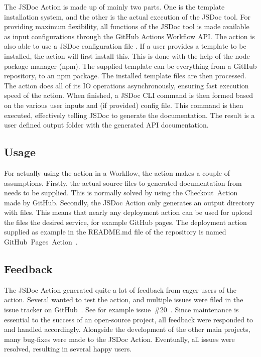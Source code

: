 The JSDoc Action is made up of mainly two parts. One is the template installation system, and the other is the actual execution of the JSDoc tool. For providing maximum flexibility, all functions of the JSDoc tool is made available as input configurations through the GitHub Actions Workflow API. The action is also able to use a JSDoc configuration file \cite{jsdoc-config-file}. If a user provides a template to be installed, the action will first install this. This is done with the help of the node package manager (npm). The supplied template can be everything from a GitHub repository, to an npm package. The installed template files are then processed. The action does all of its IO operations asynchronously, ensuring fast execution speed of the action. When finished, a JSDoc CLI command is then formed based on the various user inputs and (if provided) config file. This command is then executed, effectively telling JSDoc to generate the documentation. The result is a user defined output folder with the generated API documentation.

\subsection{Usage}
For actually using the action in a Workflow, the action makes a couple of assumptions. Firstly, the actual source files to generated documentation from needs to be supplied. This is normally solved by using the Checkout~Action~\cite{checkout-action} made by GitHub. Secondly, the JSDoc Action only generates an output directory with files. This means that nearly any deployment action can be used for upload the files the desired service, for example GitHub pages. The deployment action supplied as example in the README.md file of the repository is named GitHub~Pages~Action~\cite{github-pages-action}.

\subsection{Feedback}
The JSDoc Action generated quite a lot of feedback from eager users of the action. Several wanted to test the action, and multiple issues were filed in the issue tracker on GitHub~\cite{jsdoc-action-issue-tracker}. See for example issue~\#20~\cite{jsdoc-issue-20}. Since maintenance is essential to the success of an open-source project, all feedback were responded to and handled accordingly. Alongside the development of the other main projects, many bug-fixes were made to the JSDoc Action. Eventually, all issues were resolved, resulting in several happy users.


